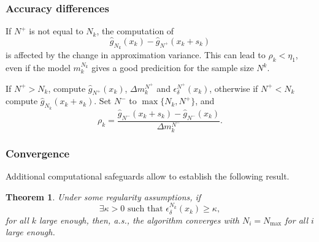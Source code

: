 \documentclass{beamer}
\newtheorem{theo}{Theorem}
\begin{document}
\begin{frame}
\frametitle{Accuracy differences}

If $N^+$ is not equal to $N_k$, the computation of
\[
 \hat{g}_{N_k} (x_k) - \hat{g}_{N^+} ( x_k + s_k )
\]
is affected by the change in approximation variance.
This can lead to $\rho_k < \eta_1$, even if the model $m_k^{N_k}$ gives a good predicition for the sample size $N^k$.



\mbox{}

If $N^+ > N_k$, compute $\hat{g}_{N^+}(x_k)$, $\Delta m_k^{N^+}$ and
$\epsilon_{\delta}^{N^+}(x_k)$, otherwise if $N^+ < N_k$ compute $\hat{g}_{N_k}(x_k + s_k)$.
Set $N^-$ to $\max\lbrace N_k, N^+ \rbrace$, and %
\[
\rho_k = \frac{\hat{g}_{N^-}(x_k+s_k) - \hat{g}_{N^-}(x_k)}{\Delta
m_k^{N^-}}.
\]

\end{frame}






\begin{frame}
\frametitle{Convergence}

Additional computational safeguards allow to establish the following result.

\begin{theo}
Under some regularity assumptions, if
\[
\exists \kappa > 0\text{ such that }
\epsilon_{\delta}^{N_k}(x_k) \geq \kappa,
\]
for all $k$ large enough, then, a.s., the algorithm converges 
with $N_i = N_{\max}$ for all $i$ large enough.
\end{theo}

\end{frame}
\end{document}
